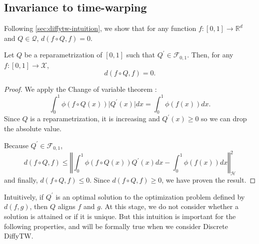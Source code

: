 \subsection{Invariance to time-warping}
Following \cref{sec:diffytw-intuition}, we show that for any function $f: [0,1] \to \mathbb R^d$ and $Q\in\mathcal Q$, $d(f\circ Q, f)=0$.
\begin{theorem}\label{thm:diffytw-invariance}
Let $Q$ be a reparametrization of $[0,1]$ such that $Q^\prime \in \mathcal F_{0, 1}$. Then, for any $f: [0,1] \to \mathcal X$,
\begin{equation}
    d(f\circ Q, f) = 0.
\end{equation}
\end{theorem}

\begin{proof}
We apply the Change of variable theorem \citep{aliprantis1998principles}:
\begin{equation}
\int_0^1 \phi(f\circ Q(x))\vert Q^\prime(x)\vert dx = \int_0^1 \phi(f(x))dx.
\end{equation}
Since $Q$ is a reparametrization, it is increasing and $Q^\prime(x) \geq 0$ so we can drop the absolute value.

Because $Q^\prime \in \mathcal F_{0,1}$,
\begin{equation}
    d(f\circ Q, f) \leq \left \Vert \int_0^1 \phi(f\circ Q(x))Q^\prime(x)dx - \int_0^1 \phi(f(x))dx\right\Vert_\mathcal H^2
\end{equation}
and finally, $d(f\circ Q, f) \leq 0$. Since $d(f\circ Q, f) \geq 0$, we have proven the result.
\end{proof}

Intuitively, if $Q^\prime$ is an optimal solution to the optimization problem defined by $d(f, g)$, then $Q$ aligns $f$ and $g$. At this stage, we do not consider whether a solution is attained or if it is unique. But this intuition is important for the following properties, and will be formally true when we consider Discrete DiffyTW.

